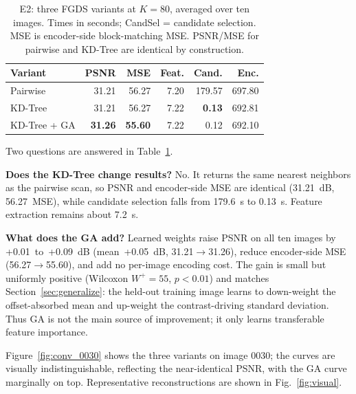 \documentclass[conference, a4paper]{IEEEtran}
\begin{document}
\begin{table}[t]
    \centering
    \caption{E2: three FGDS variants at \mbox{$K\!=\!80$}, averaged over ten images. Times in seconds; CandSel = candidate selection. MSE is encoder-side block-matching MSE. PSNR/MSE for pairwise and KD-Tree are identical by construction.}
    \label{tab:exp2}
    \small
    \setlength{\tabcolsep}{2pt}
    \begin{tabular}{lrrrrr}
        \toprule
        \textbf{Variant} & \textbf{PSNR}  & \textbf{MSE} & \textbf{Feat.} & \textbf{Cand.} & \textbf{Enc.} \\
        \midrule
        Pairwise         & 31.21          & 56.27             & 7.20             & 179.57           & 697.80          \\
        KD-Tree          & 31.21          & 56.27             & 7.22             & \textbf{0.13}    & 692.81          \\
        KD-Tree + GA     & \textbf{31.26} & \textbf{55.60}    & 7.22             & 0.12             & 692.10          \\
        \bottomrule
    \end{tabular}
\end{table}

Two questions are answered in Table~\ref{tab:exp2}.

\textbf{Does the KD-Tree change results?} No. It returns the same nearest neighbors as the pairwise scan, so PSNR and encoder-side MSE are identical (31.21~dB, 56.27~MSE), while candidate selection falls from 179.6~s to 0.13~s. Feature extraction remains about 7.2~s.

\textbf{What does the GA add?} Learned weights raise PSNR on all ten images by +0.01~to~+0.09~dB (mean~+0.05~dB, 31.21\mbox{$\to$}31.26), reduce encoder-side MSE (56.27\mbox{$\to$}55.60), and add no per-image encoding cost. The gain is small but uniformly positive (Wilcoxon \mbox{$W^+\!=\!55$}, \mbox{$p\!<\!0.01$}) and matches Section~\ref{sec:generalize}: the held-out training image learns to down-weight the offset-absorbed mean and up-weight the contrast-driving standard deviation. Thus GA is not the main source of improvement; it only learns transferable feature importance.

Figure~\ref{fig:conv_0030} shows the three variants on image 0030; the curves are visually indistinguishable, reflecting the near-identical PSNR, with the GA curve marginally on top. Representative reconstructions are shown in Fig.~\ref{fig:visual}.
\end{document}
